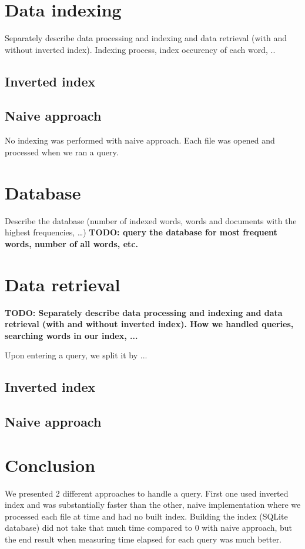 \documentclass[9pt]{IEEEtran}
\begin{document}
\section{Data indexing}
\label{section:data_indexing}

Separately describe data processing and indexing and data retrieval (with and without inverted index).
Indexing process, index occurency of each word, ..
\subsection{Inverted index}

\subsection{Naive approach}
No indexing was performed with naive approach.
Each file was opened and processed when we ran a query.

\section{Database}
Describe the database (number of indexed words, words and documents with the highest frequencies, …)
\textbf{TODO: query the database for most frequent words, number of all words, etc.}

\section{Data retrieval}
\label{section:data_retrieval}
\textbf{TODO: Separately describe data processing and indexing and data retrieval (with and without inverted index).
How we handled queries, searching words in our index, ...}

Upon entering a query, we split it by ...
\subsection{Inverted index}

\subsection{Naive approach}

\section{Conclusion}
\label{section:conclusion}
We presented 2 different approaches to handle a query.
First one used inverted index and was substantially faster than the other, naive implementation where we processed each file at time and had no built index.
Building the index (SQLite database) did not take that much time compared to 0 with naive approach, but the end result when measuring time elapsed for each query was much better. 
\end{document}

